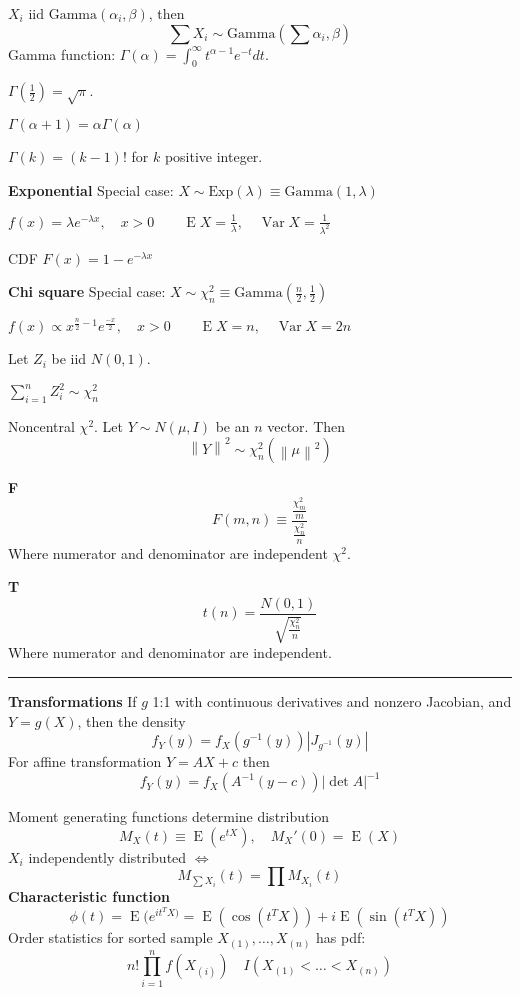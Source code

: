 \documentclass[10pt, twocolumn]{article}
\newcommand{\norm}[1]{\left\lVert#1\right\rVert}
\newcommand{\iid}{\text{ iid }}
\newcommand{\Expect}{\operatorname{E}}
\newcommand{\Var}{\operatorname{Var}}
\begin{document}
$X_i \iid \text{Gamma}(\alpha_i, \beta)$, then
\[
    \sum X_i \sim \text{Gamma}(\sum \alpha_i, \beta)
\]
Gamma function: $\Gamma(\alpha) = \int_0^\infty t^{\alpha-1} e^{-t} dt$.

$\Gamma(\frac{1}{2}) = \sqrt{\pi}$.

$\Gamma(\alpha + 1) = \alpha \Gamma(\alpha)$

$\Gamma(k) = (k-1)!$ for $k$ positive integer.

\textbf{Exponential}
Special case: $X \sim \text{Exp}(\lambda) \equiv \text{Gamma}(1, \lambda)$

$
f(x) = \lambda e^{-\lambda x},
\quad x > 0
\qquad \Expect X = \frac{1}{\lambda},
\quad \Var X = \frac{1}{\lambda ^2}
$

CDF $F(x) = 1 - e^{-\lambda x}$

\textbf{Chi square}
Special case: $X \sim \chi^2_n \equiv \text{Gamma}(\frac{n}{2}, \frac{1}{2})$

$
f(x) \propto x^{\frac{n}{2} - 1} e^{\frac{-x}{2}},
\quad x > 0
\qquad \Expect X = n,
\quad \Var X = 2n
$

Let $Z_i$ be iid $N(0, 1)$.

$\sum_{i=1}^n Z_i^2 \sim \chi^2_n$

Noncentral $\chi^2$. Let $Y \sim N(\mu, I)$ be an $n$ vector. Then 
\[
    \norm{Y}^2 \sim \chi^2_n(\norm{\mu}^2)
\]

\textbf{F}
\[
    F(m, n) \equiv \frac{\frac{\chi^2_m}{m}}
        {\frac{\chi^2_n}{n}}
\]
Where numerator and denominator are independent $\chi^2$.

\textbf{T}
\[
    t(n) = \frac{N(0, 1)}
    {\sqrt{\frac{\chi^2_n}{n}}}
\]
Where numerator and denominator are independent.

\vspace{0.2in}
\hrule

\textbf{Transformations} If $g$ 1:1 with continuous derivatives and nonzero
Jacobian, and $Y = g(X)$, then the density
\[
    f_Y(y) = f_X(g^{-1}(y)) |J_{g^{-1}}(y)|
\]
For affine transformation $Y = AX + c$ then 
\[
    f_Y(y) = f_X(A^{-1}(y - c)) |\det A|^{-1}
\]

Moment generating functions determine distribution
\[
    M_X(t) \equiv \Expect (e^{tX}),
    \quad M_X'(0) = \Expect(X)
\]
$X_i$ independently distributed $\iff$
\[
    M_{\sum X_i} (t) = \prod M_{X_i} (t)
\]
\textbf{Characteristic function}
\[
    \phi(t) = \Expect (e^{i t^T X)}
    = \Expect (\cos (t^T X)) + i \Expect(\sin(t^T X))
\]
Order statistics for sorted sample $X_{(1)}, \dots, X_{(n)}$ has pdf:
\[
    n! \prod_{i=1}^n f(X_{(i)}) \quad I(X_{(1)} < \dots < X_{(n)})
\]
\end{document}
